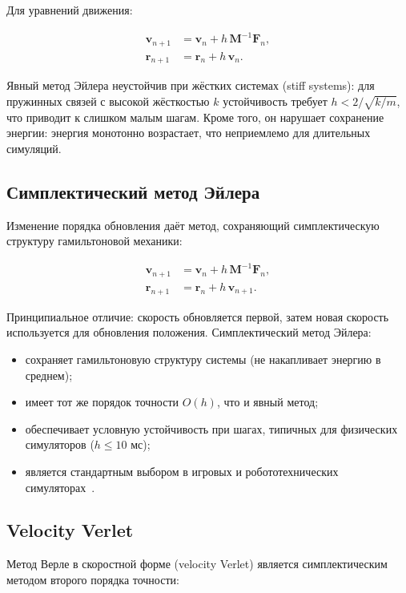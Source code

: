 Для уравнений движения:

\begin{align}
  \mathbf{v}_{n+1} &= \mathbf{v}_n + h\,\mathbf{M}^{-1}\mathbf{F}_n, \\
  \mathbf{r}_{n+1} &= \mathbf{r}_n + h\,\mathbf{v}_n.
\end{align}

Явный метод Эйлера неустойчив при жёстких системах (stiff systems): для пружинных связей с высокой жёсткостью 
$k$ устойчивость требует $h < 2/\sqrt{k/m}$, что приводит к слишком малым шагам. Кроме того, он нарушает 
сохранение энергии: энергия монотонно возрастает, что неприемлемо для длительных симуляций.

\subsection{Симплектический метод Эйлера}

Изменение порядка обновления даёт метод, сохраняющий симплектическую структуру гамильтоновой механики:

\begin{align}
  \mathbf{v}_{n+1} &= \mathbf{v}_n + h\,\mathbf{M}^{-1}\mathbf{F}_n, \label{eq:symplectic-v}\\
  \mathbf{r}_{n+1} &= \mathbf{r}_n + h\,\mathbf{v}_{n+1}. \label{eq:symplectic-r}
\end{align}

Принципиальное отличие: скорость обновляется первой, затем новая скорость используется для обновления 
положения. Симплектический метод Эйлера:

\begin{itemize}
  \item сохраняет гамильтоновую структуру системы (не накапливает энергию в среднем);
  \item имеет тот же порядок точности $O(h)$, что и явный метод;
  \item обеспечивает условную устойчивость при шагах, типичных для физических симуляторов ($h \leq 10\text{ мс}$);
  \item является стандартным выбором в игровых и робототехнических симуляторах~\cite{catto2005iterative}.
\end{itemize}

\subsection{Velocity Verlet}

Метод Верле в скоростной форме (velocity Verlet) является симплектическим методом второго порядка точности:

